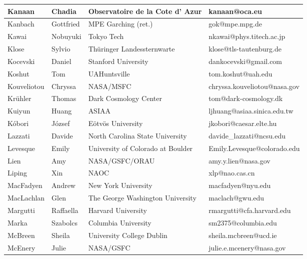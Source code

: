 \begin{center}
\begin{longtable}{|p{1.28cm} |p{1.28cm} |p{2.9cm} |p{3cm} |}
\tiny Kanaan &\tiny Chadia & \tiny Observatoire de la Cote d' Azur & \tiny kanaan@oca.eu \\ \hline
\tiny Kanbach &\tiny Gottfried & \tiny MPE Garching (ret.) & \tiny gok@mpe.mpg.de \\ \hline
\tiny Kawai &\tiny Nobuyuki & \tiny Tokyo Tech & \tiny nkawai@phys.titech.ac.jp \\ \hline
\tiny Klose &\tiny Sylvio & \tiny Th\"uringer Landessternwarte & \tiny klose@tls-tautenburg.de \\ \hline
\tiny Kocevski &\tiny Daniel & \tiny Stanford University & \tiny dankocevski@gmail.com \\ \hline
\tiny Koshut &\tiny Tom & \tiny UAHuntsville & \tiny tom.koshut@uah.edu \\ \hline
\tiny Kouveliotou &\tiny Chryssa & \tiny NASA/MSFC & \tiny chryssa.kouveliotou@nasa.gov \\ \hline
\tiny Kr\"uhler &\tiny Thomas & \tiny Dark Cosmology Center & \tiny tom@dark-cosmology.dk \\ \hline
\tiny Kuiyun &\tiny Huang & \tiny ASIAA & \tiny ljhuang@asiaa.sinica.edu.tw \\ \hline
\tiny K\'obori &\tiny J\'ozsef & \tiny E\"otv\"os University & \tiny jkobori@caesar.elte.hu \\ \hline
\tiny Lazzati &\tiny Davide & \tiny North Carolina State University & \tiny davide\_lazzati@ncsu.edu \\ \hline
\tiny Levesque &\tiny Emily & \tiny University of Colorado at Boulder & \tiny Emily.Levesque@colorado.edu \\ \hline
\tiny Lien &\tiny Amy & \tiny NASA/GSFC/ORAU & \tiny amy.y.lien@nasa.gov \\ \hline
\tiny Liping &\tiny Xin & \tiny NAOC & \tiny xlp@nao.cas.cn \\ \hline
\tiny MacFadyen &\tiny Andrew & \tiny New York University & \tiny macfadyen@nyu.edu \\ \hline
\tiny MacLachlan &\tiny Glen & \tiny The George Washington University & \tiny maclach@gwu.edu \\ \hline
\tiny Margutti &\tiny Raffaella & \tiny Harvard University & \tiny rmargutti@cfa.harvard.edu \\ \hline
\tiny Marka &\tiny Szabolcs & \tiny Columbia University & \tiny sm2375@columbia.edu \\ \hline
\tiny McBreen &\tiny Sheila & \tiny University College Dublin & \tiny sheila.mcbreen@ucd.ie \\ \hline
\tiny McEnery &\tiny Julie & \tiny NASA/GSFC & \tiny julie.e.mcenery@nasa.gov \\ \hline

\end{longtable}
\end{center}
